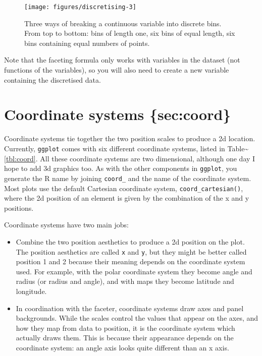 \begin{figure}
\texttt{[image: figures/discretising-3]} \caption{ Three ways of breaking a continuous variable into discrete bins. From top to bottom: bins of length one, six bins of equal length, six bins containing equal numbers of points.\label{fig:discretising3}}
\end{figure}

Note that the faceting formula only works with variables in the dataset
(not functions of the variables), so you will also need to create a new
variable containing the discretised data.

\section{Coordinate systems \{sec:coord\}}

Coordinate systems tie together the two position scales to produce a 2d
location. Currently, \texttt{ggplot} comes with six different coordinate
systems, listed in Table\textasciitilde{}\ref{tbl:coord}. All these
coordinate systems are two dimensional, although one day I hope to add
3d graphics too. As with the other components in \texttt{ggplot}, you
generate the R name by joining \texttt{coord\_} and the name of the
coordinate system. Most plots use the default Cartesian coordinate
system, \texttt{coord\_cartesian()}, where the 2d position of an element
is given by the combination of the x and y positions.
 

Coordinate systems have two main jobs:

\begin{itemize}
\itemsep1pt\parskip0pt
\item
  Combine the two position aesthetics to produce a 2d position on the
  plot. The position aesthetics are called \texttt{x} and \texttt{y},
  but they might be better called position 1 and 2 because their meaning
  depends on the coordinate system used. For example, with the polar
  coordinate system they become angle and radius (or radius and angle),
  and with maps they become latitude and longitude.
\item
  In coordination with the faceter, coordinate systems draw axes and
  panel backgrounds. While the scales control the values that appear on
  the axes, and how they map from data to position, it is the coordinate
  system which actually draws them. This is because their appearance
  depends on the coordinate system: an angle axis looks quite different
  than an x axis.
\end{itemize}

